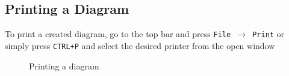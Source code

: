 \documentclass[a4paper]{article}
\begin{document}
\subsection{Printing a Diagram} 
To print a created diagram, go to the top bar and press \texttt{File $\rightarrow$ Print} or simply press \texttt{CTRL+P} and select the desired printer from the open window

\begin{figure}[H] \begin{center} 
\vspace{-20pt}
\caption{Printing a diagram} \vspace{-20pt} 
\end{center} \end{figure}
\end{document}
